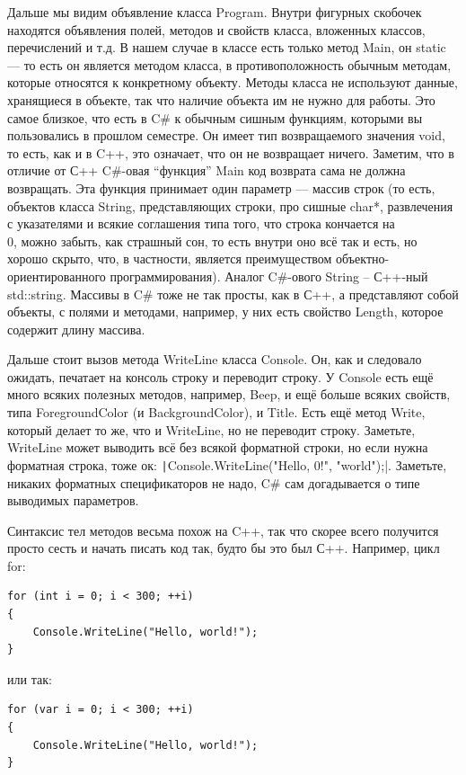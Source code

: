 \documentclass[a5paper]{article}
\begin{document}
Дальше мы видим объявление класса Program. Внутри фигурных скобочек находятся объявления полей, методов и свойств класса, вложенных классов, перечислений и т.д. В нашем случае в классе есть только метод Main, он static --- то есть он является методом класса, в противоположность обычным методам, которые относятся к конкретному объекту. Методы класса не используют данные, хранящиеся в объекте, так что наличие объекта им не нужно для работы. Это самое близкое, что есть в C\# к обычным сишным функциям, которыми вы пользовались в прошлом семестре. Он имеет тип возвращаемого значения void, то есть, как и в C++, это означает, что он не возвращает ничего. Заметим, что в отличие от С++ C\#-овая ``функция'' Main код возврата сама не должна возвращать. Эта функция принимает один параметр --- массив строк (то есть, объектов класса String, представляющих строки, про сишные char*, развлечения с указателями и всякие соглашения типа того, что строка кончается на \\0, можно забыть, как страшный сон, то есть внутри оно всё так и есть, но хорошо скрыто, что, в частности, является преимуществом объектно-ориентированного программирования). Аналог C\#-ового String – С++-ный std::string. Массивы в C\# тоже не так просты, как в С++, а представляют собой объекты, с полями и методами, например, у них есть свойство Length, которое содержит длину массива.

Дальше стоит вызов метода WriteLine класса Console. Он, как и следовало ожидать, печатает на консоль строку и переводит строку. У Console есть ещё много всяких полезных методов, например, Beep, и ещё больше всяких свойств, типа ForegroundColor (и BackgroundColor), и Title. Есть ещё метод Write, который делает то же, что и WriteLine, но не переводит строку. Заметьте, WriteLine может выводить всё без всякой форматной строки, но если нужна форматная строка, тоже ок: \texttt|Console.WriteLine("Hello, {0}!", "world");|. Заметьте, никаких форматных спецификаторов не надо, C\# сам догадывается о типе выводимых параметров.

Синтаксис тел методов весьма похож на C++, так что скорее всего получится просто сесть и начать писать код так, будто бы это был С++. Например, цикл for:

\begin{verbatim}
for (int i = 0; i < 300; ++i)
{
    Console.WriteLine("Hello, world!");
}
\end{verbatim}

или так: 

\begin{verbatim}
for (var i = 0; i < 300; ++i)
{
    Console.WriteLine("Hello, world!");
}
\end{verbatim}
\end{document}
